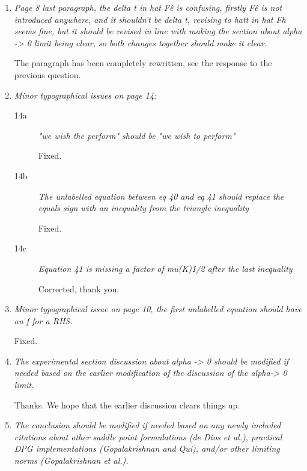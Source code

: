 \documentclass[11pt,c]{article}
\begin{document}
\begin{enumerate}
Sorry for the confusion. There is no limiting procedure here similar to the one for wave propagation
problems studied by Gopalakrishnan, Muga, and Olivares. We can simply set $\alpha = 0$
in the definition of the inner product. We have significantly expanded the explanation
in the text.


  \item {\em Page 8 last paragraph, the delta t in hat F\^e is confusing, firstly F\^e is not introduced anywhere, and it shouldn't be delta t, revising to hat{t} in hat Fh seems fine, but it should be revised in line with making the section about alpha -> 0 limit being clear, so both changes together should make it clear.}


The paragraph has been completely rewritten, see the response to the previous question.


  \item {\em Minor typographical issues on page 14:}
\begin{description}

  \item[14a] {\em  "we wish the perform" should be "we wish to perform"}

Fixed.

  \item[14b] {\em  The unlabelled equation between eq 40 and eq 41 should replace the equals sign with an inequality from the triangle inequality}

Fixed.

  \item[14c] {\em  Equation 41 is missing a factor of mu(K)\^{1/2} after the last inequality}

Corrected, thank you.

\end{description}

  \item {\em Minor typographical issue on page 10,  the first unlabelled equation should have an f for a RHS.}

Fixed.

  \item {\em The experimental section discussion about alpha -> 0 should be modified if needed based on the earlier modification of the discussion of the alpha-> 0 limit.}

Thanks. We hope that the earlier discussion clears things up.

  \item {\em The conclusion should be modified if needed based on any newly included citations about other saddle point formulations (de Dios et al.), practical DPG implementations (Gopalakrishnan and Qui), and/or other limiting norms (Gopalakrishnan et al.).}

\end{enumerate}
\end{document}
